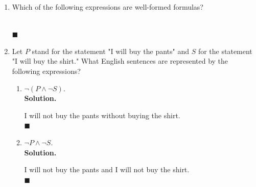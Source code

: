 \documentclass{report}
\newcommand{\sol}{\vspace{1em}\\\textbf{Solution.}\vspace{0.5em}}
\newcommand{\qed}{‎\\‎\hfill$\blacksquare$\vspace{1em}}
\begin{document}
\begin{enumerate}[leftmargin=*]
      \item  Which of the following expressions are well-formed formulas?
            \begin{enumerate}
                  \setlength{\columnsep}{1cm}
            \end{enumerate}\vspace{-2em}‎\qed

      \item Let $P$ stand for the statement "I will buy the pants" and $S$ for the
            statement "I will buy the shirt." What English sentences are represented by the
            following expressions?
            \begin{enumerate}
                  \item $\neg(P \wedge \neg S)$.
                        \sol{}

                        I will not buy the pants without buying the shirt. \qed

                  \item $\neg P \wedge \neg S$.
                        \sol{}

                        I will not buy the pants and I will not buy the shirt. \qed


\end{enumerate}
\end{enumerate}
\end{document}
